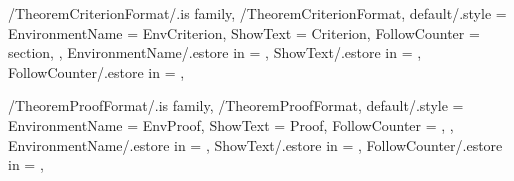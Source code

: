 \newcommand{\InsertAssertion}[2][\empty]
{%
  \InsertTheoremContent[#1]{\GetTheoremAssertionFormatEnvironmentName}{#2}%
} %

\newcommand{\InitTheoremAssertionFormat}
{%
  \theoremstyle{plain}%
  \ifthenelse{\equal{\GetTheoremAssertionFormatFollowCounter}{\empty}}%
  {%
    \newtheorem{%
      \GetTheoremAssertionFormatEnvironmentName}{%
      \GetTheoremAssertionFormatShowText}%
  }%
  {%
    \newtheorem{%
      \GetTheoremAssertionFormatEnvironmentName}{%
      \GetTheoremAssertionFormatShowText}[%
      \GetTheoremAssertionFormatFollowCounter]%
  }%
} %


\pgfkeys
{
  /TheoremCriterionFormat/.is family, /TheoremCriterionFormat,
  default/.style =
  {
    EnvironmentName = {EnvCriterion},
    ShowText = {Criterion},
    FollowCounter = section,
  },
  EnvironmentName/.estore in = \GetTheoremCriterionFormatEnvironmentName,
  ShowText/.estore in = \GetTheoremCriterionFormatShowText,
  FollowCounter/.estore in = \GetTheoremCriterionFormatFollowCounter,
} %

\newcommand{\InsertCriterion}[2][\empty]
{%
  \InsertTheoremContent[#1]{\GetTheoremCriterionFormatEnvironmentName}{#2}%
} %

\newcommand{\InitTheoremCriterionFormat}
{%
  \theoremstyle{plain}%
  \ifthenelse{\equal{\GetTheoremCriterionFormatFollowCounter}{\empty}}%
  {%
    \newtheorem{%
      \GetTheoremCriterionFormatEnvironmentName}{%
      \GetTheoremCriterionFormatShowText}%
  }%
  {%
    \newtheorem{%
      \GetTheoremCriterionFormatEnvironmentName}{%
      \GetTheoremCriterionFormatShowText}[%
      \GetTheoremCriterionFormatFollowCounter]%
  }%
} %


\pgfkeys
{
  /TheoremProofFormat/.is family, /TheoremProofFormat,
  default/.style =
  {
    EnvironmentName = {EnvProof},
    ShowText = {Proof},
    FollowCounter = \empty,
  },
  EnvironmentName/.estore in = \GetTheoremProofFormatEnvironmentName,
  ShowText/.estore in = \GetTheoremProofFormatShowText,
  FollowCounter/.estore in = \GetTheoremProofFormatFollowCounter,
} %

\newcommand{\InsertProof}[1]
{%
  \InsertTheoremContent[\empty]{%
    \GetTheoremProofFormatEnvironmentName}{#1}%
} %

